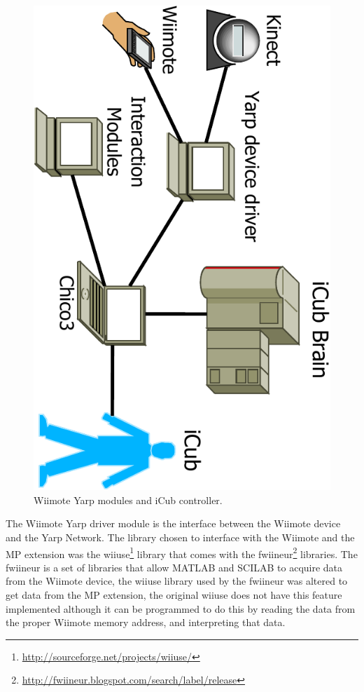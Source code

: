 	\begin{figure}[htb]
	\begin{center}
	\includegraphics[scale=0.50,page=2,angle=90]{icubSimpleNetworkDiagram-crop.pdf}
	\end{center}
	\caption[\ac{Wiimote} modules diagram]{\ac{Wiimote} Yarp modules and iCub controller.} 
	\label{fig:WiimoteNetworkDiagram}
	\end{figure}
	
	The \ac{Wiimote} Yarp driver module is the interface between the \ac{Wiimote} device and the Yarp Network. The library chosen to interface with the \ac{Wiimote} and the \ac{MP} extension was the wiiuse\footnote{\url{http://sourceforge.net/projects/wiiuse/}} library that comes with the fwiineur\footnote{\url{http://fwiineur.blogspot.com/search/label/release}} libraries. The fwiineur is a set of libraries that allow MATLAB and SCILAB to acquire data from the \ac{Wiimote} device, the wiiuse library used by the fwiineur was altered to get data from the \ac{MP} extension, the original wiiuse does not have this feature implemented although it can be programmed to do this by reading the data from the proper \ac{Wiimote} memory address, and interpreting that data.
	

